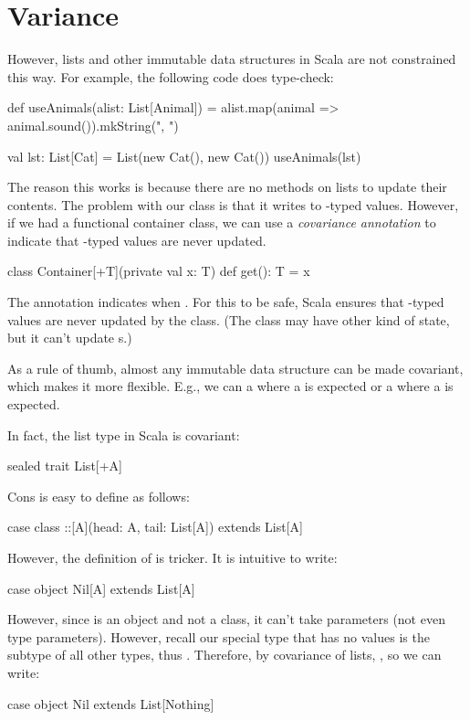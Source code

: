 \documentclass{book}
\begin{document}
\section{Variance}

However, lists and other immutable data structures in Scala are not constrained
this way. For example, the following code does type-check:

\begin{scalacode}
def useAnimals(alist: List[Animal]) = {
  alist.map(animal => animal.sound()).mkString(", ")
}

val lst: List[Cat] = List(new Cat(), new Cat())
useAnimals(lst)
\end{scalacode}

The reason this works is because there are no methods on lists to update
their contents. The problem with our  class is
that it writes to -typed values. However, if we had a functional
container class, we can use a \emph{covariance annotation} to indicate
that -typed values are never updated.

\begin{scalacode}
class Container[+T](private val x: T) {
  def get(): T = x
}
\end{scalacode}

The  annotation indicates  when . For this to be safe,
Scala ensures that -typed values are never updated
by the class. (The class may have other kind of state, but it can't
update s.)

As a rule of thumb, almost any immutable data structure can be made
covariant, which makes it more flexible. E.g., we can a 
where a  is expected or a 
where a  is expected.

In fact, the list type in Scala is covariant:
%
\begin{scalacode}
sealed trait List[+A]
\end{scalacode}
Cons is easy to define as follows:
\begin{scalacode}
case class ::[A](head: A, tail: List[A]) extends List[A]
\end{scalacode}
However, the definition of  is tricker. It is intuitive
to write:
\begin{scalacode}
case object Nil[A] extends List[A]
\end{scalacode}
However, since  is an object and not a class, it can't
take parameters (not even type parameters).
However, recall our special type  that has no values is the subtype of all other types, thus
. Therefore, by covariance of lists, , so
we can write:
\begin{scalacode}
case object Nil extends List[Nothing]
\end{scalacode}
\end{document}
